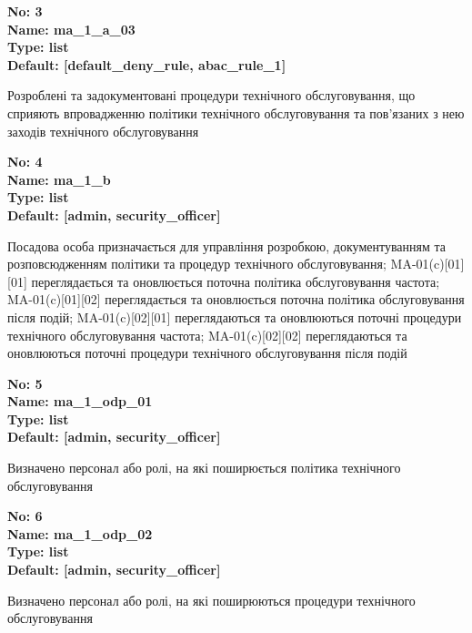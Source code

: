 \documentclass{article}
\begin{document}
{\footnotesize\bfseries
No: 3\\
Name: ma\_\allowbreak{}1\_\allowbreak{}a\_\allowbreak{}03\\
Type: list\\
Default: [\textquotedbl{}default\_\allowbreak{}deny\_\allowbreak{}rule\textquotedbl{}, \textquotedbl{}abac\_\allowbreak{}rule\_\allowbreak{}1\textquotedbl{}]
}

{\footnotesize Розроблені та задокументовані процедури технічного обслуговування, що сприяють впровадженню політики технічного обслуговування та пов'язаних з нею заходів технічного обслуговування}


{\footnotesize\bfseries
No: 4\\
Name: ma\_\allowbreak{}1\_\allowbreak{}b\\
Type: list\\
Default: [\textquotedbl{}admin\textquotedbl{}, \textquotedbl{}security\_\allowbreak{}officer\textquotedbl{}]
}

{\footnotesize Посадова особа призначається для управління розробкою, документуванням та розповсюдженням політики та процедур технічного обслуговування; MA-01(c)[01][01] переглядається та оновлюється поточна політика обслуговування частота; MA-01(c)[01][02] переглядається та оновлюється поточна політика обслуговування після подій; MA-01(c)[02][01] переглядаються та оновлюються поточні процедури технічного обслуговування частота; MA-01(c)[02][02] переглядаються та оновлюються поточні процедури технічного обслуговування після подій}


{\footnotesize\bfseries
No: 5\\
Name: ma\_\allowbreak{}1\_\allowbreak{}odp\_\allowbreak{}01\\
Type: list\\
Default: [\textquotedbl{}admin\textquotedbl{}, \textquotedbl{}security\_\allowbreak{}officer\textquotedbl{}]
}

{\footnotesize Визначено персонал або ролі, на які поширюється політика технічного обслуговування}


{\footnotesize\bfseries
No: 6\\
Name: ma\_\allowbreak{}1\_\allowbreak{}odp\_\allowbreak{}02\\
Type: list\\
Default: [\textquotedbl{}admin\textquotedbl{}, \textquotedbl{}security\_\allowbreak{}officer\textquotedbl{}]
}

{\footnotesize Визначено персонал або ролі, на які поширюються процедури технічного обслуговування}
\end{document}
